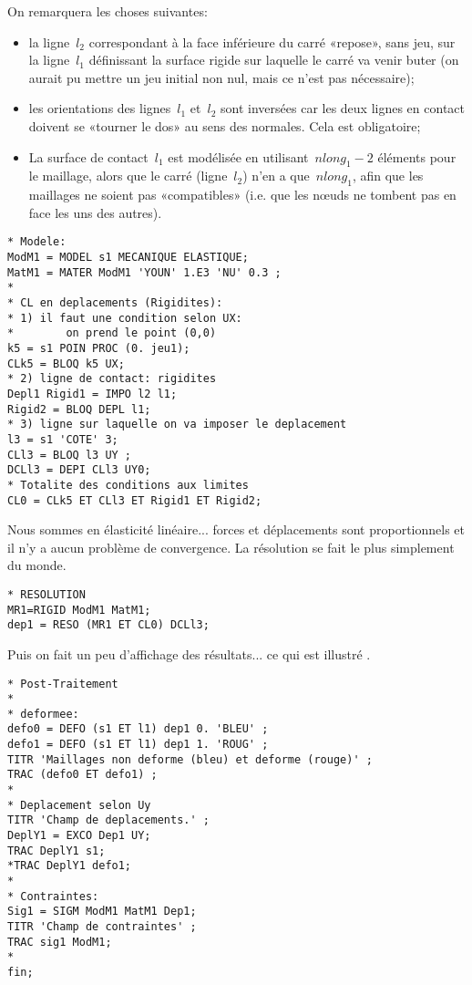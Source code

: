 On remarquera les choses suivantes:
\begin{itemize}
  \item la ligne~$l_2$ correspondant à la face inférieure du carré «repose», sans jeu, sur la ligne~$l_1$ définissant la surface rigide sur laquelle le carré va venir buter (on aurait pu mettre un jeu initial non nul, mais ce n'est pas nécessaire);
  \item les orientations des lignes~$l_1$ et~$l_2$ sont inversées car les deux lignes en contact doivent se  «tourner le dos» au sens des normales. Cela est obligatoire;
  \item La surface de contact~$l_1$ est modélisée en utilisant~$nlong_1-2$ éléments pour le maillage, alors que le carré (ligne~$l_2$) n'en a que~$nlong_1$, afin que les maillages ne soient pas «compatibles» (i.e. que les nœuds ne tombent pas en face les uns des autres).
\end{itemize}
\begin{multicols}{2}
\begin{lstlisting}[firstnumber=last]
* Modele:
ModM1 = MODEL s1 MECANIQUE ELASTIQUE;
MatM1 = MATER ModM1 'YOUN' 1.E3 'NU' 0.3 ;
*
* CL en deplacements (Rigidites):
* 1) il faut une condition selon UX: 
*        on prend le point (0,0)
k5 = s1 POIN PROC (0. jeu1);
CLk5 = BLOQ k5 UX;
* 2) ligne de contact: rigidites
Depl1 Rigid1 = IMPO l2 l1;
Rigid2 = BLOQ DEPL l1;
* 3) ligne sur laquelle on va imposer le deplacement
l3 = s1 'COTE' 3;
CLl3 = BLOQ l3 UY ;
DCLl3 = DEPI CLl3 UY0;
* Totalite des conditions aux limites
CL0 = CLk5 ET CLl3 ET Rigid1 ET Rigid2;
\end{lstlisting}
\end{multicols}

Nous sommes en élasticité linéaire... forces et déplacements sont proportionnels et il n'y a aucun problème de convergence. La résolution se fait le plus simplement du monde.
\begin{lstlisting}[firstnumber=last]
* RESOLUTION
MR1=RIGID ModM1 MatM1;
dep1 = RESO (MR1 ET CL0) DCLl3;
\end{lstlisting}

Puis on fait un peu d'affichage des résultats... ce qui est illustré .
\begin{multicols}{2}
\begin{lstlisting}[firstnumber=last]
* Post-Traitement
*
* deformee:
defo0 = DEFO (s1 ET l1) dep1 0. 'BLEU' ;
defo1 = DEFO (s1 ET l1) dep1 1. 'ROUG' ;
TITR 'Maillages non deforme (bleu) et deforme (rouge)' ;
TRAC (defo0 ET defo1) ;
*
* Deplacement selon Uy
TITR 'Champ de deplacements.' ;
DeplY1 = EXCO Dep1 UY;
TRAC DeplY1 s1;
*TRAC DeplY1 defo1;
*
* Contraintes:
Sig1 = SIGM ModM1 MatM1 Dep1;
TITR 'Champ de contraintes' ;
TRAC sig1 ModM1;
*
fin;
\end{lstlisting}
\end{multicols}

